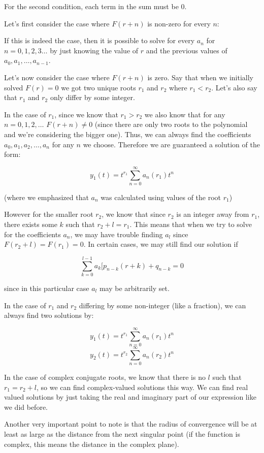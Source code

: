 \documentclass{report}
\begin{document}
{For the second condition, each term in the sum must be 0. 

Let's first consider the case where $F(r+n)$ is non-zero for every $n$:

If this is indeed the case, then it is possible to solve for every $a_n$ for $n=0,1,2,3 \dots$ by just knowing the value of $r$ and the previous values of $a_0, a_1, \dots, a_{n-1}$.


Let's now consider the case where $F(r+n)$ is zero. Say that when we initially solved $F(r) = 0$ we got two unique roots $r_1$ and $r_2$ where $r_1 < r_2$. Let's also say that $r_1$ and $r_2$ only differ by some integer.

In the case of $r_1$, since we know that $r_1 > r_2$ we also know that for any $n=0,1,2,\dots$ $F(r+n) \neq 0$ (since there are only two roots to the polynomial and we're considering the bigger one). Thus, we can always find the coefficients $a_0, a_1, a_2, \dots, a_n$ for any $n$ we choose. Therefore we are guaranteed a solution of the form:

$$y_1(t) = t^{r_1} \sum_{n=0}^\infty a_n(r_1)t^n$$

(where we emphasized that $a_n$ was calculated using values of the root $r_1$)

However for the smaller root $r_2$, we know that since $r_2$ is an integer away from $r_1$, there exists some $k$ such that $r_2 + l = r_1$. This means that when we try to solve for the coefficients $a_n$, we may have trouble finding $a_l$ since $F(r_2+l) = F(r_1) = 0$. In certain cases, we may still find our solution if  

$$\sum_{k=0}^{l-1}a_k[ p_{n-k}(r+k) + q_{n-k} = 0$$

since in this particular case $a_l$ may be arbitrarily set. 

In the case of $r_1$ and $r_2$ differing by some non-integer (like a fraction), we can always find two solutions by:


$$y_1(t) = t^{r_1} \sum_{n=0}^\infty a_n(r_1)t^n$$
$$y_2(t) = t^{r_2} \sum_{n=0}^\infty a_n(r_2)t^n$$

In the case of complex conjugate roots, we know that there is no $l$ such that $r_1 = r_2 + l$, so we can find complex-valued solutions this way. We can find real valued solutions by just taking the real and imaginary part of our expression like we did before.


Another very important point to note is that the radius of convergence will be at least as large as the distance from the next singular point (if the function is complex, this means the distance in the complex plane). 



}
\end{document}
